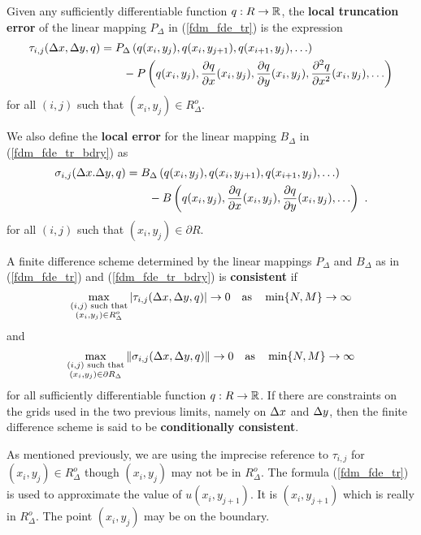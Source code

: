 \begin{defn}\label{fdm_consist_def}
Given any sufficiently differentiable function $q:R \to \mathbb{R}$, the
{\bfseries local truncation error} of the linear mapping $P_\Delta$ in
(\ref{fdm_fde_tr}) is the expression
\begin{align*}
\tau_{i,j}(\Delta{x},\Delta{y},q)
&= P_\Delta\left(q(x_i,y_j), q(x_i,y_{j+1}), q(x_{i+1},y_j), \ldots\right) \\
&\qquad - P\left(q(x_i,y_j), \frac{\partial{q}}{\partial{x}}(x_i,y_j), \frac{\partial{q}}{\partial{y}}(x_i,y_j),
\frac{\partial^{2}{q}}{\partial{x}^{2}}(x_i,y_j), \ldots \right)
\end{align*}
for all $(i,j)$ such that $(x_i,y_j) \in R^o_\Delta$.

We also define the {\bfseries local error} for the linear mapping
$B_\Delta$ in (\ref{fdm_fde_tr_bdry}) as
\begin{align*}
\sigma_{i,j}(\Delta{x}.\Delta{y},q)
&= B_\Delta\left(q(x_i,y_j), q(x_i,y_{j+1}), q(x_{i+1},y_j),
\ldots\right) \\
&\qquad - B\left(q(x_i,y_j), \frac{\partial{q}}{\partial{x}}(x_i,y_j), \frac{\partial{q}}{\partial{y}}(x_i,y_j),
\ldots \right) \ .
\end{align*}
for all $(i,j)$ such that $(x_i,y_j) \in \partial R$.

A finite difference scheme determined by the linear mappings
$P_\Delta$ and $B_\Delta$ as in (\ref{fdm_fde_tr}) and
(\ref{fdm_fde_tr_bdry}) is
{\bfseries consistent} if
\[
\max_{\substack{(i,j) \text{ such that}\\(x_i,y_j) \in R^o_\Delta}}
|\tau_{i,j}(\Delta{x},\Delta{y},q)| \rightarrow 0 \quad \text{as} \quad
\min \{N, M\} \rightarrow \infty
\]
and
\[
\max_{\substack{(i,j) \text{ such that}\\(x_i,y_j) \in \partial R_\Delta}}
\|\sigma_{i,j}(\Delta{x},\Delta{y},q)\| \rightarrow 0 \quad \text{as} \quad
\min \{N, M\} \rightarrow \infty
\]
for all sufficiently differentiable function $q:R \to \mathbb{R}$.
If there are constraints on the grids used in the two previous limits,
namely on $\Delta{x}$ and $\Delta{y}$, then the finite difference scheme
is said to be {\bfseries conditionally consistent}.
\end{defn}

As mentioned previously, we are using the imprecise reference to
$\tau_{i,j}$ for $(x_i,y_j) \in R^o_\Delta$ though
$(x_i,y_j)$ may not be in $R^o_\Delta$.  The formula
(\ref{fdm_fde_tr}) is used to approximate the value of
$u(x_i,y_{j+1})$.  It is $(x_i,y_{j+1})$ which is really in
$R^o_\Delta$.   The point $(x_i,y_j)$ may be on the boundary.

